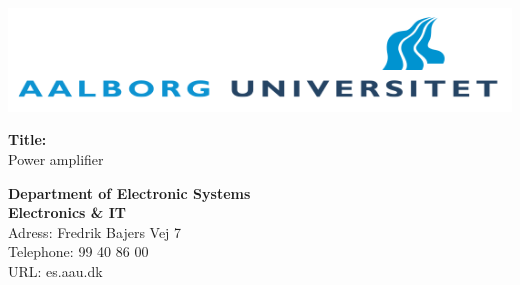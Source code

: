 \begin{multicols}{2}
\includegraphics[scale=0.35]{forside/aau.png}

\small{\textbf{Title:\\}
Power amplifier}

\scriptsize{\textbf{Department of Electronic Systems\\ Electronics \& IT\\}
Adress: Fredrik Bajers Vej 7\\
Telephone: 99 40 86 00\\
URL: es.aau.dk \\}
\end{multicols}
